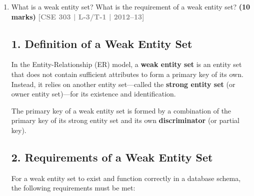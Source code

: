 \documentclass[12pt,a3paper]{article}
\newcommand{\yr}[1]{\hfill\textcolor{gray}{\small\textbf{[#1]}}}
\newcommand{\mk}[1]{\textcolor{orange!70!black}{\small\textbf{(#1 marks)}}}
\begin{document}
\begin{enumerate}
\begin{tcolorbox}[enhanced,breakable,ansbox,colback=cA!4,colframe=cA,boxrule=0.8pt,arc=5pt,title={\textbf{Answer}},fonttitle=\bfseries\color{white},colbacktitle=cA]
\begin{center}
\end{center}

\end{tcolorbox}

\item What is a weak entity set? What is the requirement of a weak entity set?
\mk{10} \yr{CSE 303 | L-3/T-1 | 2012--13}

\begin{tcolorbox}[enhanced,breakable,ansbox,colback=cA!4,colframe=cA,boxrule=0.8pt,arc=5pt,title={\textbf{Answer}},fonttitle=\bfseries\color{white},colbacktitle=cA]

\subsection*{1. Definition of a Weak Entity Set}
In the Entity-Relationship (ER) model, a \textbf{weak entity set} is an entity set that does not contain sufficient attributes to form a primary key of its own. Instead, it relies on another entity set—called the \textbf{strong entity set} (or owner entity set)—for its existence and identification. 

The primary key of a weak entity set is formed by a combination of the primary key of its strong entity set and its own \textbf{discriminator} (or partial key).

\subsection*{2. Requirements of a Weak Entity Set}
For a weak entity set to exist and function correctly in a database schema, the following requirements must be met:


\end{tcolorbox}
\end{enumerate}
\end{document}
